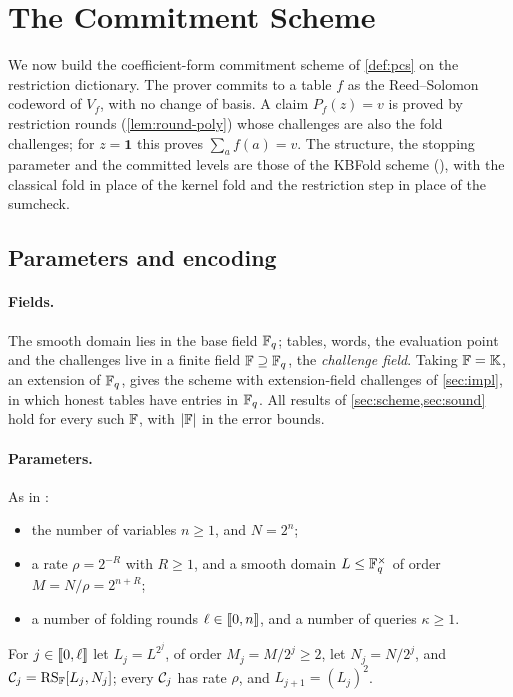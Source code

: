 \section{The Commitment Scheme}\label{sec:scheme}

We now build the coefficient-form commitment scheme of \cref{def:pcs} on the restriction dictionary.
The prover commits to a table $f$ as the Reed--Solomon codeword of $V_f$, with no change of basis.
A claim $P_f(z) = v$ is proved by restriction rounds (\cref{lem:round-poly}) whose challenges are also the fold challenges; for $z = \mathbf 1$ this proves $\sum_a f(a) = v$.
The structure, the stopping parameter and the committed levels are those of the KBFold scheme (), with the classical fold in place of the kernel fold and the restriction step in place of the sumcheck.

\subsection{Parameters and encoding}\label{sec:scheme:params}

\paragraph{Fields.}
The smooth domain lies in the base field $\mathbb{F}_q$; tables, words, the evaluation point and the challenges live in a finite field $\mathbb{F} \supseteq \mathbb{F}_q$, the \emph{challenge field}.
Taking $\mathbb{F} = \mathbb{K}$, an extension of $\mathbb{F}_q$, gives the scheme with extension-field challenges of \cref{sec:impl}, in which honest tables have entries in $\mathbb{F}_q$.
All results of \cref{sec:scheme,sec:sound} hold for every such $\mathbb{F}$, with $|\mathbb{F}|$ in the error bounds.

\paragraph{Parameters.}
As in :
\begin{itemize}
  \item the number of variables $n \ge 1$, and $N = 2^n$;
  \item a rate $\rho = 2^{-R}$ with $R \ge 1$, and a smooth domain $L \le \mathbb{F}_q^\times$ of order $M = N/\rho = 2^{n+R}$;
  \item a number of folding rounds $\ell \in \llbracket 0, n \rrbracket$, and a number of queries $\kappa \ge 1$.
\end{itemize}
For $j \in \llbracket 0, \ell \rrbracket$ let $L_j = L^{2^j}$, of order $M_j = M/2^j \ge 2$, let $N_j = N/2^j$, and $\mathcal{C}_j = \mathrm{RS}_{\mathbb{F}}[L_j, N_j]$; every $\mathcal{C}_j$ has rate $\rho$, and $L_{j+1} = (L_j)^2$.

